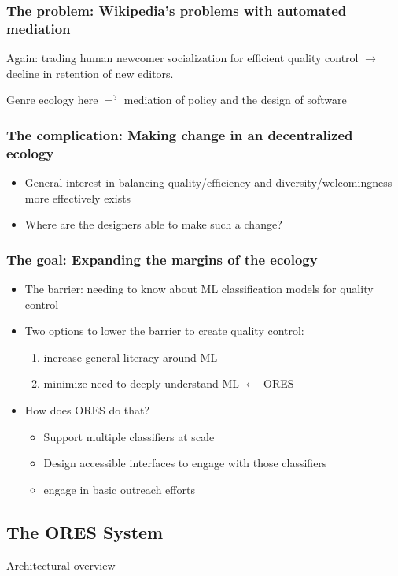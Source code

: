\documentclass[12pt,a4paper]{article}
\begin{document}
\subsubsection{The problem: Wikipedia's problems with automated mediation}
Again: trading human newcomer socialization for efficient quality control \(\rightarrow\) decline in retention of new editors.

Genre ecology here \(=^?\) mediation of policy and the design of software
\subsubsection{The complication: Making change in an decentralized ecology}
\begin{itemize}
\item General interest in balancing quality/efficiency and
diversity/welcomingness more effectively exists
\item Where are the designers able to make such a change?
\end{itemize}
\subsubsection{The goal: Expanding the margins of the ecology}
\begin{itemize}
\item The barrier: needing to know about ML classification models for quality control
\item Two options to lower the barrier to create quality control: 
\begin{enumerate}
\item increase general literacy around ML
\item minimize need to deeply understand ML \(\leftarrow\) ORES
\end{enumerate}
\item How does ORES do that?
\begin{itemize}
\item Support multiple classifiers at scale
\item Design accessible interfaces to engage with those classifiers
\item engage in basic outreach efforts
\end{itemize}
\end{itemize}
\subsection{The ORES System}
Architectural overview
\end{document}
